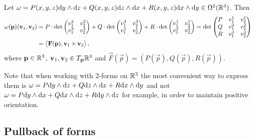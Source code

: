 \documentclass[11pt,a4paper]{article}
\begin{document}
\begin{example}
  Let $\omega = P(x,y,z) \dy \wedge \dz + Q(x,y,z) \dz \wedge \dx + R(x,y,z) \dx \wedge \dy \in \Omega^2(\R^3)$.
  Then
  \begin{align*}
    \omega(\boldsymbol{\mathbf{p}})(\boldsymbol{\mathbf{v}}_1, \boldsymbol{\mathbf{v}}_2) &=
    P \cdot \det
    \begin{pmatrix}
      v_1^2 & v_2^2 \\
      v_1^3 & v_2^3
    \end{pmatrix} +
    Q \cdot \det
    \begin{pmatrix}
      v_1^3 & v_2^3 \\
      v_1^1 & v_2^1
    \end{pmatrix} +
    R \cdot \det
    \begin{pmatrix}
      v_1^1 & v_2^1 \\
      v_1^2 & v_2^2
    \end{pmatrix} =
    \det
    \begin{pmatrix}
      P & v_1^1 & v_2^1 \\
      Q & v_1^2 & v_2^2 \\
      R & v_1^3 & v_2^3
    \end{pmatrix} \\ &=
    \left\langle \boldsymbol{\mathbf{F}}(\boldsymbol{\mathbf{p}}), \boldsymbol{\mathbf{v}}_1 \times \boldsymbol{\mathbf{v}}_2 \right\rangle,
  \end{align*}
  where $\boldsymbol{\mathbf{p}} \in \mathbb{R}^3$, $\boldsymbol{\mathbf{v}}_1, \boldsymbol{\mathbf{v}}_2 \in T_{\boldsymbol{\mathbf{p}}}\mathbb{R}^3$ and
  $\vec F(\vec p) = (P(\vec p),Q(\vec p),R(\vec p))$.
\end{example}

\begin{remark}
  Note that when working with $2$-forms on $\mathbb{R}^3$ the most convenient
  way to express them is
  $\omega = P \dy \wedge \dz + Q \dz \wedge \dx + R \dx \wedge \dy$
  and not
  $\omega = P \dy \wedge \dx + Q \dx \wedge \dz + R \dy \wedge \dz$
  for example, in order to maintain positive orientation.
\end{remark}

\subsection{Pullback of forms}
\end{document}
